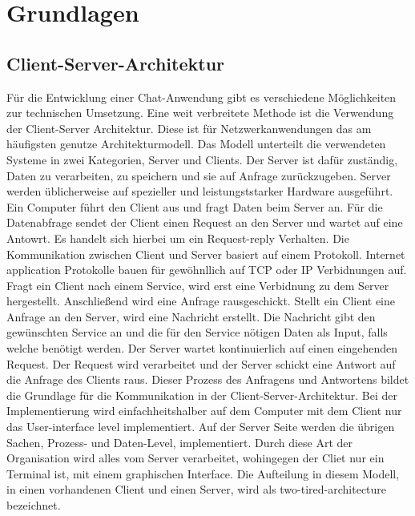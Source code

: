 \section{Grundlagen}
\subsection{Client-Server-Architektur}
Für die Entwicklung einer Chat-Anwendung gibt es verschiedene Möglichkeiten zur technischen Umsetzung.
Eine weit verbreitete Methode ist die Verwendung der Client-Server Architektur. Diese ist für Netzwerkanwendungen das am häufigsten genutze Architekturmodell. 
Das Modell unterteilt die verwendeten Systeme in zwei Kategorien, Server und Clients.
Der Server ist dafür zuständig, Daten zu verarbeiten, zu speichern und sie auf Anfrage zurückzugeben. Server werden üblicherweise auf spezieller und leistungststarker Hardware ausgeführt.  
Ein Computer führt den Client aus und fragt Daten beim Server an\cite{client-server_2019}. 
Für die Datenabfrage sendet der Client einen Request an den Server und wartet auf eine Antowrt.
Es handelt sich hierbei um ein Request-reply Verhalten.
Die Kommunikation zwischen Client und Server basiert auf einem Protokoll. 
Internet application Protokolle bauen für gewöhnllich auf TCP oder IP Verbidnungen auf\cite[S. 79ff]{steen23}. 
Fragt ein Client nach einem Service, wird erst eine Verbidnung zu dem Server hergestellt. Anschließend wird eine Anfrage rausgeschickt.
Stellt ein Client eine Anfrage an den Server, wird eine Nachricht erstellt. Die Nachricht gibt den gewünschten Service an und die für den Service nötigen Daten als Input, falls welche benötigt werden.
Der Server wartet kontinuierlich auf einen eingehenden Request. Der Request wird verarbeitet und der Server schickt eine Antwort auf die Anfrage des Clients raus\cite{tan10}.
Dieser Prozess des Anfragens und Antwortens bildet die Grundlage für die Kommunikation in der Client-Server-Architektur.
Bei der Implementierung wird einfachheitshalber auf dem Computer mit dem Client nur das User-interface level implementiert.
Auf der Server Seite werden die übrigen Sachen, Prozess- und Daten-Level, implementiert.
Durch diese Art der Organisation wird alles vom Server verarbeitet, wohingegen der Cliet nur ein Terminal ist, mit einem graphischen Interface.
Die Aufteilung in diesem Modell, in einen vorhandenen Client und einen Server, wird als two-tired-architecture bezeichnet\cite[S. 80]{steen23}.
